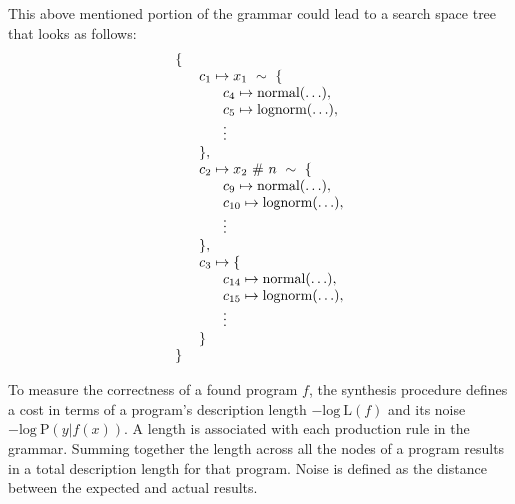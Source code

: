 \documentclass[letterpaper]{llncs}
\begin{document}
This above mentioned portion of the grammar could lead to a search space tree that looks as follows:
\[
  \begin{array}{l }
    \{ \\
    \hspace{6mm} c_1 \mapsto x_1\ \sim\ \{ \\
        \hspace{12mm} c_4 \mapsto \text{normal}(\hdots), \\
        \hspace{12mm} c_5 \mapsto \text{lognorm}(\hdots), \\ 
        \hspace{12mm} \vdots \\
    \hspace{6mm}\},\\
    \hspace{6mm} c_2 \mapsto x_2\ \#\ n\ \sim\ \{ \\
        \hspace{12mm} c_9 \mapsto \text{normal}(\hdots), \\
        \hspace{12mm} c_{10} \mapsto \text{lognorm}(\hdots), \\ 
        \hspace{12mm} \vdots \\
    \hspace{6mm}\},\\
    \hspace{6mm} c_3 \mapsto \{ \\
        \hspace{12mm} c_{14} \mapsto \text{normal}(\hdots), \\
        \hspace{12mm} c_{15} \mapsto \text{lognorm}(\hdots), \\ 
        \hspace{12mm} \vdots \\
    \hspace{6mm}\}\\
    \}
    
  \end{array}
\]

To measure the correctness of a found program $f$, 
the synthesis procedure defines a cost in terms of a program's
description length $-\text{log}\ \text{L}(f)$ and its noise $-\text{log}\ \text{P}(y|f(x)) $.
A length is associated with each production rule in the grammar.
Summing together the length across all the nodes of a program results 
in a total description length for that program. 
Noise is defined as the distance between the expected and actual results.
\end{document}
